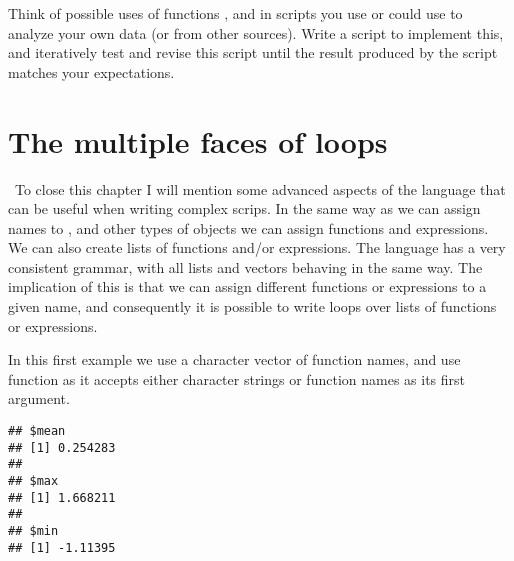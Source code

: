 \documentclass[krantz2]{krantz}\usepackage{knitr}%
\begin{document}
\begin{advplayground}
Think of possible uses of functions ,  and  in scripts you use or could use to analyze your own data (or from other sources). Write a script to implement this, and iteratively test and revise this script until the result produced by the script matches your expectations.
\end{advplayground}

\section{The multiple faces of loops}

\ilAdvanced\ To close this chapter I will mention some advanced aspects of the \Rlang language that can be useful when writing complex scrips. In the same way as we can assign names to ,  and other types of objects we can assign functions and expressions. We can also create lists of functions and/or expressions. The \Rlang language has a very consistent grammar, with all lists and vectors behaving in the same way. The implication of this is that we can assign different functions or expressions to a given name, and consequently it is possible to write loops over lists of functions or expressions.

In this first example we use a character vector of function names, and use function  as it accepts either character strings or function names as its first argument.

\begin{knitrout}\footnotesize
{}\color{fgcolor}\begin{kframe}
\begin{alltt}
 \hlkwb{<-} \hlstd{(}\hlstd{)}
 \hlkwb{<-} \hlstd{()}
 \hlkwb{<-} \hlstd{(}\hlstd{,} \hlstd{,} \hlstd{)}
   
    \hlkwb{<-}  
   \hlstd{\}}
\end{alltt}
\begin{verbatim}
## $mean
## [1] 0.254283
## 
## $max
## [1] 1.668211
## 
## $min
## [1] -1.11395
\end{verbatim}
\end{kframe}
\end{knitrout}
\end{document}
